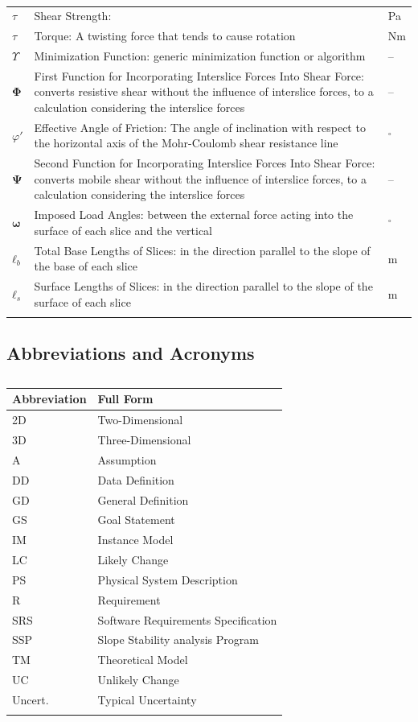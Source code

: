 \documentclass[12pt]{article}
\begin{document}
\begin{longtabu}{l X[l] l}
\\
$τ$ & Shear Strength:  & Pa
\\
$τ$ & Torque: A twisting force that tends to cause rotation & Nm
\\
$Υ$ & Minimization Function: generic minimization function or algorithm & --
\\
$\mathbf{Φ}$ & First Function for Incorporating Interslice Forces Into Shear Force: converts resistive shear without the influence of interslice forces, to a calculation considering the interslice forces & --
\\
$φ'$ & Effective Angle of Friction: The angle of inclination with respect to the horizontal axis of the Mohr-Coulomb shear resistance line & ${}^{\circ}$
\\
$\mathbf{Ψ}$ & Second Function for Incorporating Interslice Forces Into Shear Force: converts mobile shear without the influence of interslice forces, to a calculation considering the interslice forces & --
\\
$\mathbf{ω}$ & Imposed Load Angles: between the external force acting into the surface of each slice and the vertical & ${}^{\circ}$
\\
${\mathbf{ℓ}_{b}}$ & Total Base Lengths of Slices: in the direction parallel to the slope of the base of each slice & m
\\
${\mathbf{ℓ}_{s}}$ & Surface Lengths of Slices: in the direction parallel to the slope of the surface of each slice & m
\\
\bottomrule
\caption{}
\label{Table:ToS}
\end{longtabu}
\subsection{Abbreviations and Acronyms}
\label{Sec:TAbbAcc}
\begin{longtable}{l l}
\toprule
\textbf{Abbreviation} & \textbf{Full Form}
\\
\midrule
\endhead
2D & Two-Dimensional
\\
3D & Three-Dimensional
\\
A & Assumption
\\
DD & Data Definition
\\
GD & General Definition
\\
GS & Goal Statement
\\
IM & Instance Model
\\
LC & Likely Change
\\
PS & Physical System Description
\\
R & Requirement
\\
SRS & Software Requirements Specification
\\
SSP & Slope Stability analysis Program
\\
TM & Theoretical Model
\\
UC & Unlikely Change
\\
Uncert. & Typical Uncertainty
\\
\bottomrule
\caption{}
\label{Table:TAbbAcc}
\end{longtable}
\end{document}
